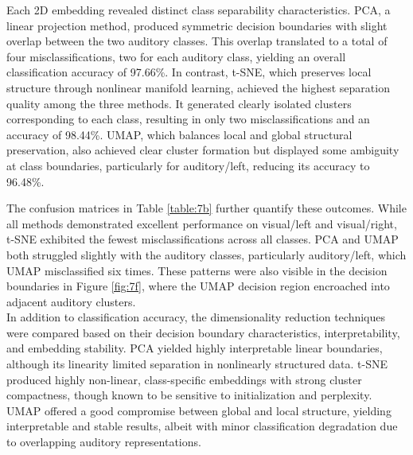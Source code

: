 \noindent Each 2D embedding revealed distinct class separability characteristics. PCA, a linear projection method, produced symmetric decision boundaries with slight overlap between the two auditory classes. This overlap translated to a total of four misclassifications, two for each auditory class, yielding an overall classification accuracy of 97.66\%. In contrast, t-SNE, which preserves local structure through nonlinear manifold learning, achieved the highest separation quality among the three methods. It generated clearly isolated clusters corresponding to each class, resulting in only two misclassifications and an accuracy of 98.44\%. UMAP, which balances local and global structural preservation, also achieved clear cluster formation but displayed some ambiguity at class boundaries, particularly for auditory/left, reducing its accuracy to 96.48\%.
\begin{table}[ht]
    \centering
    \caption{Classification accuracy (\%) for each stimulus class using PCA, t-SNE, and UMAP embeddings followed by logistic regression.}
    \label{table:7b}
\end{table}

\noindent The confusion matrices in Table \ref{table:7b} further quantify these outcomes. While all methods demonstrated excellent performance on visual/left and visual/right, t-SNE exhibited the fewest misclassifications across all classes. PCA and UMAP both struggled slightly with the auditory classes, particularly auditory/left, which UMAP misclassified six times. These patterns were also visible in the decision boundaries in Figure \ref{fig:7f}, where the UMAP decision region encroached into adjacent auditory clusters.\\

\noindent In addition to classification accuracy, the dimensionality reduction techniques were compared based on their decision boundary characteristics, interpretability, and embedding stability. PCA yielded highly interpretable linear boundaries, although its linearity limited separation in nonlinearly structured data. t-SNE produced highly non-linear, class-specific embeddings with strong cluster compactness, though known to be sensitive to initialization and perplexity. UMAP offered a good compromise between global and local structure, yielding interpretable and stable results, albeit with minor classification degradation due to overlapping auditory representations.\\

